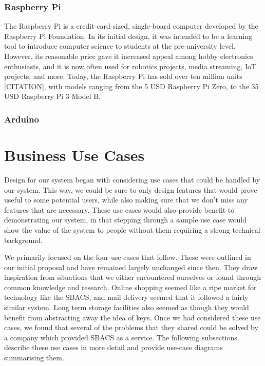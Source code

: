 \documentclass[12pt]{report}
\let\Oldsubsection\subsection
\renewcommand{\subsection}{\FloatBarrier\Oldsubsection}
\begin{document}

\subsection{Raspberry Pi} \label{raspberry-pi}

The Raspberry Pi is a credit-card-sized, single-board computer developed by the Raspberry Pi Foundation. In its initial 
design, it was intended to be a learning tool to introduce computer science to students at the pre-university  
level. However, its reasonable price gave it increased appeal among hobby electronics enthusiasts, and it is now often 
used for robotics projects, media streaming, IoT projects, and more. Today, the Raspberry Pi has sold over ten million 
units [CITATION], with models ranging from the 5 USD Raspberry Pi Zero, to the 35 USD Raspberry Pi 3 Model B.


\subsection{Arduino} \label{arduino}




\chapter{Business Use Cases} \label{business-use-cases}

Design for our system began with considering use cases that could be handled by our system. This way, we could be sure
to only design features that would prove useful to some potential users, while also making sure that we don't miss any
features that are necessary. These use cases would also provide benefit to demonstrating our system, in that stepping
through a sample use case would show the value of the system to people without them requiring a strong technical
background.

We primarily focused on the four use cases that follow. These were outlined in our initial proposal and have remained
largely unchanged since then. They draw inspiration from situations that we either encountered ourselves or found
through common knowledge and research. Online shopping seemed like a ripe market for technology like the SBACS, and
mail delivery seemed that it followed a fairly similar system. Long term storage facilities also seemed as though they
would benefit from abstracting away the idea of keys. Once we had considered these use cases, we found that several of
the problems that they shared could be solved by a company which provided SBACS as a service. The following subsections
describe these use cases in more detail and provide use-case diagrams summarising them.
\end{document}
